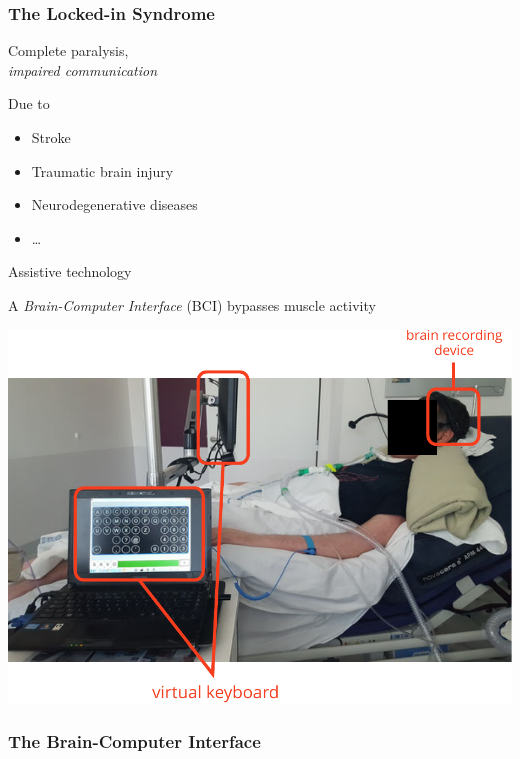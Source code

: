 \documentclass{kul-ulille-beamer}
\begin{document}
\begin{frame}[noframenumbering]
  \frametitle{The Locked-in Syndrome}
  \centering
  \begin{minipage}[c]{.4\textwidth}
    \small
    \raggedright
    Complete paralysis, \\ \emph{impaired communication}
    \bigskip

    Due to
    \begin{itemize}
      \item Stroke
      \item Traumatic brain injury
      \item Neurodegenerative diseases
      \item \ldots
    \end{itemize}
    \bigskip

  Assistive technology
  \bigskip

    A \emph{Brain-Computer Interface} (BCI) bypasses muscle activity

 \end{minipage}\hfill%
  \begin{minipage}[c]{.5\textwidth}
    \includegraphics[width=\textwidth]{figures/intro/damien_annot.pdf}
  \end{minipage}
\end{frame}




%
\begin{frame}
  \frametitle{The Brain-Computer Interface}
\end{frame}
\end{document}
